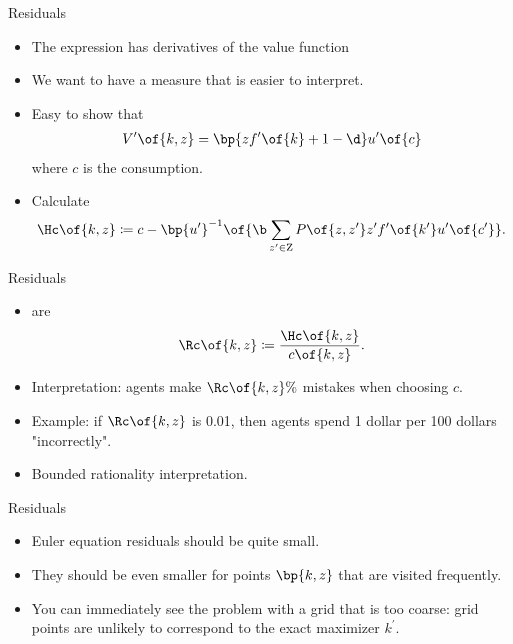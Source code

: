 \documentclass[11pt,xcolor={dvipsnames},aspectratio=159,hyperref={pdftex,pdfpagemode=UseNone,hidelinks,pdfdisplaydoctitle=true},usepdftitle=false]{beamer}
\begin{document}
\begin{frame}{Residuals}   
    \begin{itemize}
        \item The expression has derivatives of the value function 
        \item We want to have a measure that is easier to interpret. 
        \item Easy to show  that \begin{align*}
            V^\prime\of{k,z} = \bp{z f^\prime\of{k} + 1 -\d} u^\prime\of{c} 
        \end{align*}
        where $c$ is the  consumption.
        \item Calculate \begin{align*}
            \Hc\of{k,z} \coloneq c - \bp{u^\prime}^{-1}\of{ \b \sum_{z^\prime \in \text{Z}} P\of{z,z^\prime} z^\prime f^\prime\of{k^\prime} u^\prime\of{c^\prime}}.
        \end{align*}
      
        \end{itemize}
    \end{frame}   

\begin{frame}{Residuals}   
    \begin{itemize}
        \item {} are \begin{align*}
            \Rc\of{k,z} \coloneq \frac{\Hc\of{k,z}}{c\of{k,z}}.
        \end{align*}
        \item Interpretation: agents make $ \Rc\of{k,z}\%$ mistakes when choosing $c$.
        \item Example: if $\Rc\of{k,z}$ is 0.01, then agents spend 1 dollar per 100 dollars "incorrectly".
        \item Bounded rationality interpretation. 

        \end{itemize}
    \end{frame}   

    \begin{frame}{Residuals}   
        \begin{itemize}
            \item Euler equation residuals should be quite small.
            \item They should be even smaller for points $\bp{k,z}$ that are visited frequently.
            \item You can immediately see the problem with a grid that is too coarse: grid points are unlikely to correspond to the exact maximizer $k^\prime$. 
            \end{itemize}
        \end{frame}   
\end{document}
